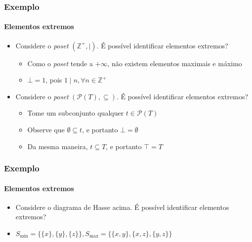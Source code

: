 \documentclass[12pt]{beamer}
\begin{document}
\begin{frame}
  \frametitle{Exemplo}
  \framesubtitle{Elementos extremos}
  \begin{itemize}
    \item Considere o \emph{poset} $(\mathbb{Z}^{+}, \mid)$. É possível
        identificar elementos extremos?
    \begin{itemize}[itemsep=0pt]
      \item Como o \emph{poset} tende a $+\infty$, não existem elementos
          maximais e máximo
      \item $\bot = 1$, pois $1 \mid n, \forall n \in \mathbb{Z}^{+}$
    \end{itemize}
\item Considere o \emph{poset} $(\mathcal{P}(T), \subseteq)$. É possível
        identificar elementos extremos?
    \begin{itemize}[itemsep=0pt]
      \item Tome um subconjunto qualquer $t \in \mathcal{P}(T)$
      \item Observe que $\emptyset \subseteq t$, e portanto $\bot = \emptyset$
      \item Da mesma maneira, $t \subseteq T$, e portanto $\top = T$
    \end{itemize}
  \end{itemize}
\end{frame}

\begin{frame}
  \frametitle{Exemplo}
  \framesubtitle{Elementos extremos}
  \centering
  \begin{itemize}
    \item Considere o diagrama de Hasse acima. É possível identificar elementos
        extremos?
    \item $S_{\min} = \{\{x\}, \{y\}, \{z\}\}, S_{\max} = \{\{x, y\}, \{x, z\},
        \{y, z\}\}$
  \end{itemize}
\end{frame}
\end{document}
